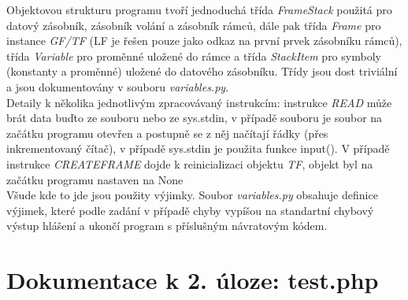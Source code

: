 \documentclass[10pt]{article}
\begin{document}
Objektovou strukturu programu tvoří jednoduchá třída \textit{FrameStack} použitá pro datový zásobník, zásobník volání a zásobník rámců, dále pak třída \textit{Frame} pro instance \textit{GF/TF} (LF je řešen pouze jako odkaz na první prvek zásobníku rámců), třída \textit{Variable} pro proměnné uložené do rámce a třída \textit{StackItem} pro symboly (konstanty a proměnné) uložené do datového zásobníku. Třídy jsou dost triviální a jsou dokumentovány v souboru \textit{variables.py}.\\
Detaily k několika jednotlivým zpracovávaný instrukcím: instrukce \textit{READ} může brát data buďto ze souboru nebo ze sys.stdin, v případě souboru je soubor na začátku programu otevřen a postupně se z něj načítají řádky (přes inkrementovaný čítač), v případě sys.stdin je použita funkce input(). V případě instrukce \textit{CREATEFRAME} dojde k reinicializaci objektu \textit{TF}, objekt byl na začátku programu nastaven na None\\
Všude kde to jde jsou použity výjimky. Soubor \textit{variables.py} obsahuje definice výjimek, které podle zadání v případě chyby vypíšou na standartní chybový výstup hlášení a ukončí program s příslušným návratovým kódem. 
\section*{Dokumentace k 2. úloze: test.php}
\end{document}
